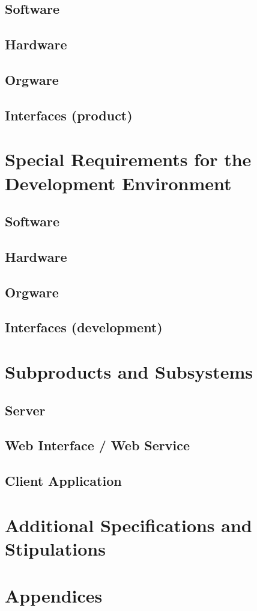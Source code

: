 \documentclass[11pt,a4paper,oneside,svgnames]{report}
\begin{document}
\section{Software}
\section{Hardware}
\section{Orgware}
\section{Interfaces (product)}

\chapter{Special Requirements for the Development Environment}
\section{Software}
\section{Hardware}
\section{Orgware}
\section{Interfaces (development)}

\chapter{Subproducts and Subsystems}
\section{Server}
\section{Web Interface / Web Service}
\section{Client Application}

\chapter{Additional Specifications and Stipulations}
\chapter{Appendices}
\printglossaries
\end{document}
